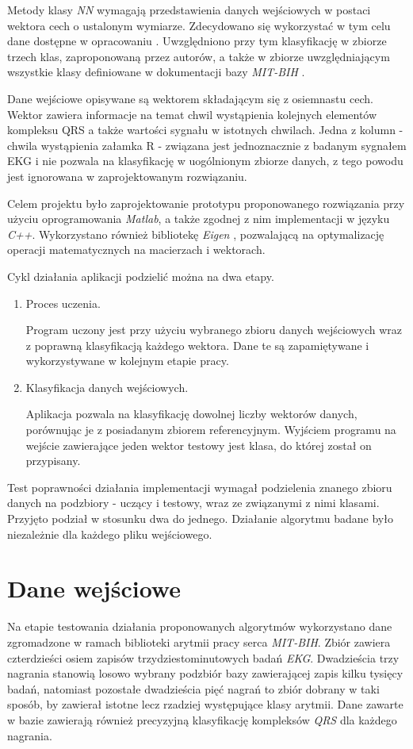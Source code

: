 Metody klasy \textit{NN} wymagają przedstawienia danych wejściowych w postaci wektora cech o ustalonym wymiarze. Zdecydowano się wykorzystać w tym celu dane dostępne w opracowaniu \cite{heart-class-module}. Uwzględniono przy tym klasyfikację w zbiorze trzech klas, zaproponowaną przez autorów, a także w zbiorze uwzględniającym wszystkie klasy definiowane w dokumentacji bazy \textit{MIT-BIH} \cite{mitdb}.

Dane wejściowe opisywane są wektorem składającym się z osiemnastu cech. Wektor zawiera informacje na temat chwil wystąpienia kolejnych elementów kompleksu QRS a także wartości sygnału w istotnych chwilach. Jedna z kolumn - chwila wystąpienia załamka R - związana jest jednoznacznie z badanym sygnałem EKG i nie pozwala na klasyfikację w uogólnionym zbiorze danych, z tego powodu jest ignorowana w zaprojektowanym rozwiązaniu.

Celem projektu było zaprojektowanie prototypu proponowanego rozwiązania przy użyciu oprogramowania \textit{Matlab}, a także zgodnej z nim implementacji w języku \textit{C++}. Wykorzystano również bibliotekę \textit{Eigen} \cite{eigen-www}, pozwalającą na optymalizację operacji matematycznych na macierzach i wektorach.

Cykl działania aplikacji podzielić można na dwa etapy.
\begin{enumerate}
	\item Proces uczenia.
	
	Program uczony jest przy użyciu wybranego zbioru danych wejściowych wraz z poprawną klasyfikacją każdego wektora. Dane te są zapamiętywane i wykorzystywane w kolejnym etapie pracy.
	
	\item
	Klasyfikacja danych wejściowych.
	
	Aplikacja pozwala na klasyfikację dowolnej liczby wektorów danych, porównując je z posiadanym zbiorem referencyjnym. Wyjściem programu na wejście zawierające jeden wektor testowy jest klasa, do której został on przypisany.
\end{enumerate}

Test poprawności działania implementacji wymagał podzielenia znanego zbioru danych na podzbiory - uczący i testowy, wraz ze związanymi z nimi klasami. Przyjęto podział w stosunku dwa do jednego. Działanie algorytmu badane było niezależnie dla każdego pliku wejściowego.

\section{Dane wejściowe}
Na etapie testowania działania proponowanych algorytmów wykorzystano dane zgromadzone w ramach biblioteki arytmii pracy serca \textit{MIT-BIH}. Zbiór zawiera czterdzieści osiem zapisów trzydziestominutowych badań \textit{EKG}. Dwadzieścia trzy nagrania stanowią losowo wybrany podzbiór bazy zawierającej zapis kilku tysięcy badań, natomiast pozostałe dwadzieścia pięć nagrań to zbiór dobrany w taki sposób, by zawierał istotne lecz rzadziej występujące klasy arytmii. Dane zawarte w bazie zawierają również precyzyjną klasyfikację kompleksów \textit{QRS} dla każdego nagrania.

